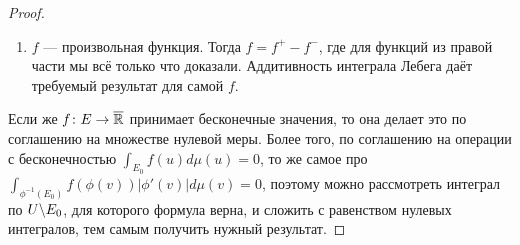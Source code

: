 \begin{proof}
\begin{enumerate}
		\item $f$ --- произвольная функция. Тогда $f = f^+ - f^-$, где для функций из правой части мы всё только что доказали. Аддитивность интеграла Лебега даёт требуемый результат для самой $f$.
	\end{enumerate}

	Если же $f \colon E \to \overline{\mathbb{R}}$ принимает бесконечные значения, то она делает это по соглашению на множестве нулевой меры. Более того, по соглашению на операции с бесконечностью $\int_{E_0} f(u)d\mu(u) = 0$, то же самое про $\int_{\phi^{-1}(E_0)} f(\phi(v))|\phi'(v)|d\mu(v) = 0$, поэтому можно рассмотреть интеграл по $U \backslash E_0$, для которого формула верна, и сложить с равенством нулевых интегралов, тем самым получить нужный результат.
\end{proof}
